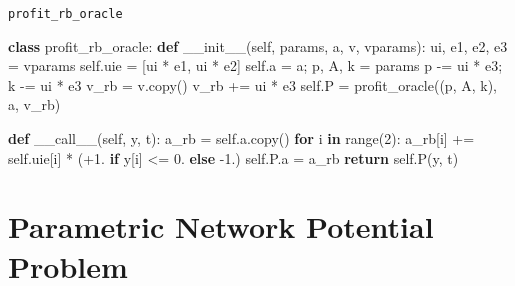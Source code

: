 \documentclass[10pt,ignorenonframetext,serif,onlymath]{beamer}
\newenvironment{Shaded}{}{}
\newcommand{\BuiltInTok}[1]{#1}
\newcommand{\ControlFlowTok}[1]{\textcolor[rgb]{0.00,0.44,0.13}{\textbf{#1}}}
\newcommand{\DecValTok}[1]{\textcolor[rgb]{0.25,0.63,0.44}{#1}}
\newcommand{\FloatTok}[1]{\textcolor[rgb]{0.25,0.63,0.44}{#1}}
\newcommand{\FunctionTok}[1]{\textcolor[rgb]{0.02,0.16,0.49}{#1}}
\newcommand{\KeywordTok}[1]{\textcolor[rgb]{0.00,0.44,0.13}{\textbf{#1}}}
\newcommand{\NormalTok}[1]{#1}
\newcommand{\OperatorTok}[1]{\textcolor[rgb]{0.40,0.40,0.40}{#1}}
\newcommand{\VariableTok}[1]{\textcolor[rgb]{0.10,0.09,0.49}{#1}}
\begin{document}
\begin{frame}[fragile]{\texttt{profit\_rb\_oracle}}
\protect\hypertarget{sec:profit_rb_oracle}{}

\begin{Shaded}
\begin{Highlighting}[]
\KeywordTok{class}\NormalTok{ profit_rb_oracle:}
    \KeywordTok{def} \FunctionTok{__init__}\NormalTok{(}\VariableTok{self}\NormalTok{, params, a, v, vparams):}
\NormalTok{        ui, e1, e2, e3 }\OperatorTok{=}\NormalTok{ vparams}
        \VariableTok{self}\NormalTok{.uie }\OperatorTok{=}\NormalTok{ [ui }\OperatorTok{*}\NormalTok{ e1, ui }\OperatorTok{*}\NormalTok{ e2]}
        \VariableTok{self}\NormalTok{.a }\OperatorTok{=}\NormalTok{ a}\OperatorTok{;}\NormalTok{ p, A, k }\OperatorTok{=}\NormalTok{ params}
\NormalTok{        p }\OperatorTok{-=}\NormalTok{ ui }\OperatorTok{*}\NormalTok{ e3}\OperatorTok{;}\NormalTok{ k }\OperatorTok{-=}\NormalTok{ ui }\OperatorTok{*}\NormalTok{ e3}
\NormalTok{        v_rb }\OperatorTok{=}\NormalTok{ v.copy()}
\NormalTok{        v_rb }\OperatorTok{+=}\NormalTok{ ui }\OperatorTok{*}\NormalTok{ e3}
        \VariableTok{self}\NormalTok{.P }\OperatorTok{=}\NormalTok{ profit_oracle((p, A, k), a, v_rb)}

    \KeywordTok{def} \FunctionTok{__call__}\NormalTok{(}\VariableTok{self}\NormalTok{, y, t):}
\NormalTok{        a_rb }\OperatorTok{=} \VariableTok{self}\NormalTok{.a.copy()}
        \ControlFlowTok{for}\NormalTok{ i }\KeywordTok{in} \BuiltInTok{range}\NormalTok{(}\DecValTok{2}\NormalTok{):}
\NormalTok{            a_rb[i] }\OperatorTok{+=} \VariableTok{self}\NormalTok{.uie[i] }\OperatorTok{*}\NormalTok{ (}\OperatorTok{+}\FloatTok{1.}
                        \ControlFlowTok{if}\NormalTok{ y[i] }\OperatorTok{<=} \FloatTok{0.} \ControlFlowTok{else} \FloatTok{-1.}\NormalTok{)}
        \VariableTok{self}\NormalTok{.P.a }\OperatorTok{=}\NormalTok{ a_rb}
        \ControlFlowTok{return} \VariableTok{self}\NormalTok{.P(y, t)}
\end{Highlighting}
\end{Shaded}

\end{frame}

\hypertarget{sec:parametric-network-potential-problem}{%
\section{Parametric Network Potential
Problem}\label{sec:parametric-network-potential-problem}}
\end{document}
